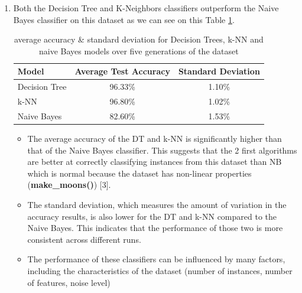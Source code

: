 \documentclass[acmconf,nonacm=true]{acmart}
\begin{document}
\begin{enumerate}
    \item
    Both the Decision Tree and K-Neighbors classifiers outperform the Naive Bayes classifier on this dataset as we can see on this Table \ref{tab:avg_acc_std_comp}.

    \begin{table}[H]
        \centering
        \begin{tabular}{|l|c|c|}
            \hline
            \textbf{Model} & \textbf{Average Test Accuracy} & \textbf{Standard Deviation} \\
            \hline
            Decision Tree & 96.33\% & 1.10\% \\
            k-NN & 96.80\% & 1.02\% \\
            Naive Bayes &  82.60\% & 1.53\% \\
            \hline
        \end{tabular}
        \caption{average accuracy \& standard deviation for Decision Trees, k-NN and naive Bayes models over five generations of the dataset}
        \label{tab:avg_acc_std_comp}
    \end{table}

    \begin{itemize}
        \item 
        The average accuracy of the DT and k-NN is significantly higher than that of the Naive Bayes classifier. This suggests that the 2 first algorithms are better at correctly classifying instances from this dataset than NB which is normal because the dataset has non-linear properties (\textbf{make\_moons()}) \label{disadv_nb} [3].

        \item 
        The standard deviation, which measures the amount of variation in the accuracy results, is also lower for the DT and k-NN compared to the Naive Bayes. This indicates that the performance of those two is more consistent across different runs.
        
        \item
        The performance of these classifiers can be influenced by many factors, including the characteristics of the dataset (number of instances, number of features, noise level)
        

\end{itemize}
\end{enumerate}
\end{document}
